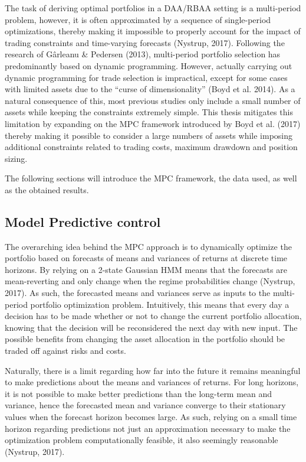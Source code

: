 The task of deriving optimal portfolios in a DAA/RBAA setting is a multi-period problem, however, it is often approximated by a sequence of single-period optimizations, thereby making it impossible to
properly account for the impact of trading constraints and time-varying forecasts (Nystrup, 2017). Following the research of Gârleanu \&
Pedersen (2013), multi-period portfolio selection has predominantly based on dynamic programming. However, actually carrying out dynamic programming for trade selection is impractical, except for
some cases with limited assets due to the “curse of dimensionality” (Boyd et al. 2014). As a natural consequence of this, most previous studies only include a small number of assets while keeping the constraints extremely simple. This thesis mitigates this limitation by expanding on the MPC framework introduced by Boyd et al. (2017) thereby making it possible to consider a large numbers of assets
while imposing additional constraints related to trading costs, maximum drawdown and position sizing.

The following sections will introduce the MPC framework, the data used, as well as the obtained results.

\subsection{Model Predictive control}
\label{Subsection: Model predictive control}

The overarching idea behind the MPC approach is to dynamically optimize the portfolio based on forecasts of
means and variances of returns at discrete time horizons. By relying on a 2-state Gaussian HMM means that the forecasts are mean-reverting and
only change when the regime probabilities change (Nystrup, 2017). As such, the forecasted means and variances serve as inputs to the multi-period portfolio optimization problem. Intuitively, this means that every day a decision has to be made whether or not to change the current portfolio allocation, knowing that the decision will be reconsidered the next day with new input. The possible benefits from changing the asset allocation in the portfolio should be traded off against risks and costs. 

Naturally, there is a limit regarding how far into the future it remains meaningful to make predictions about the means and variances of returns. For long horizons, it is not possible to make better predictions than
the long-term mean and variance, hence the forecasted mean and variance converge to their stationary values when the forecast horizon becomes large. As such, relying on a small time horizon regarding predictions not just
an approximation necessary to make the optimization problem computationally
feasible, it also seemingly reasonable (Nystrup, 2017).

